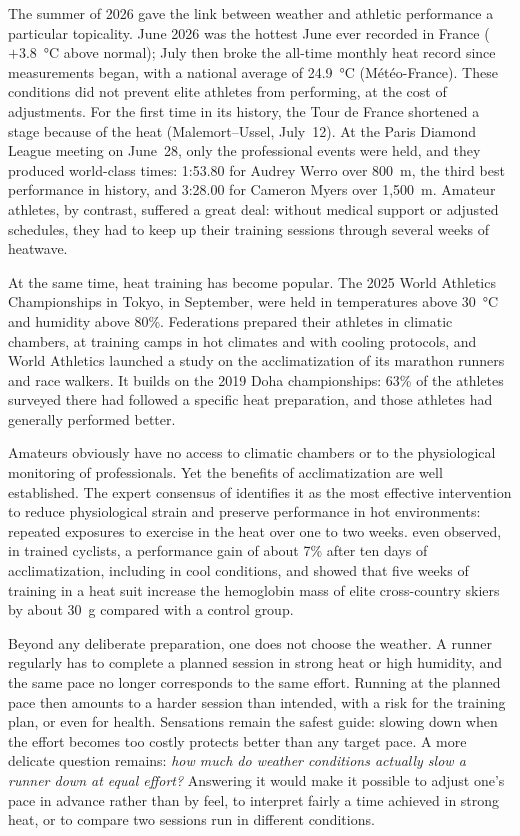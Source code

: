 \documentclass[11pt,a4paper]{article}
\begin{document}
The summer of 2026 gave the link between weather and athletic performance a particular topicality. June 2026 was the
hottest June ever recorded in France ($+3.8$~°C above normal); July then broke the all-time monthly heat record since
measurements began, with a national average of 24.9~°C (Météo-France). These conditions did not prevent elite
athletes from performing, at the cost of adjustments. For the first time in its history, the Tour de France shortened
a stage because of the heat (Malemort--Ussel, July~12). At the Paris Diamond League meeting on June~28, only the
professional events were held, and they produced world-class times: 1:53.80 for Audrey Werro over 800~m, the third
best performance in history, and 3:28.00 for Cameron Myers over 1,500~m. Amateur athletes, by contrast, suffered a
great deal: without medical support or adjusted schedules, they had to keep up their training sessions through
several weeks of heatwave.

At the same time, heat training has become popular. The 2025 World Athletics Championships in Tokyo, in September,
were held in temperatures above 30~°C and humidity above 80\%. Federations prepared their athletes in climatic
chambers, at training camps in hot climates and with cooling protocols, and World Athletics launched a study on the
acclimatization of its marathon runners and race walkers. It builds on the 2019 Doha championships: 63\% of the
athletes surveyed there had followed a specific heat preparation, and those athletes had generally performed better.

Amateurs obviously have no access to climatic chambers or to the physiological monitoring of professionals. Yet the
benefits of acclimatization are well established. The expert consensus of \citet{racinais2015} identifies it as the
most effective intervention to reduce physiological strain and preserve performance in hot environments: repeated
exposures to exercise in the heat over one to two weeks. \citet{lorenzo2010} even observed, in trained cyclists, a
performance gain of about 7\% after ten days of acclimatization, including in cool conditions, and
\citet{ronnestad2022} showed that five weeks of training in a heat suit increase the hemoglobin mass of elite
cross-country skiers by about 30~g compared with a control group.

Beyond any deliberate preparation, one does not choose the weather. A runner regularly has to complete a planned
session in strong heat or high humidity, and the same pace no longer corresponds to the same effort. Running at the
planned pace then amounts to a harder session than intended, with a risk for the training plan, or even for health.
Sensations remain the safest guide: slowing down when the effort becomes too costly protects better than any target
pace. A more delicate question remains: \emph{how much do weather conditions actually slow a runner down at equal
effort?} Answering it would make it possible to adjust one's pace in advance rather than by feel, to interpret fairly
a time achieved in strong heat, or to compare two sessions run in different conditions.
\end{document}
